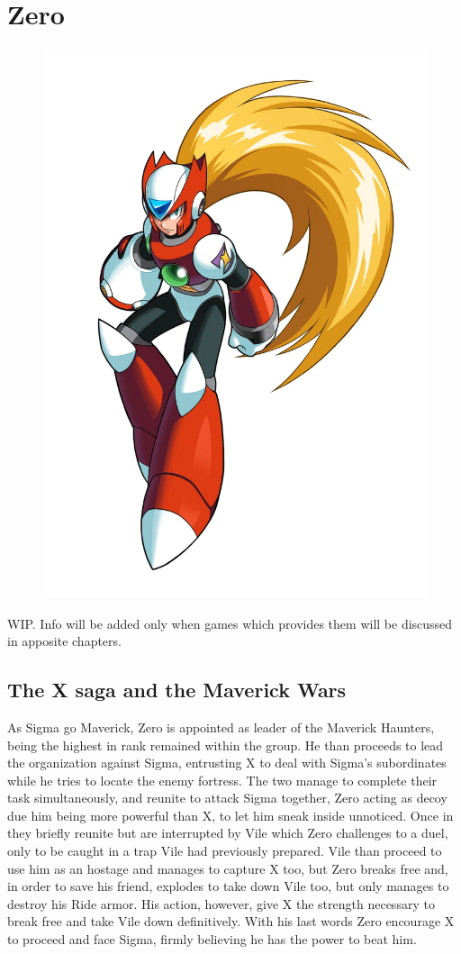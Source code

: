 \chapter{Zero}\label{char:Zero}
\begin{figure}[h]
	\centering
	\includegraphics[width=0.4\linewidth]{figures/Characters/Char_Z.png}
\end{figure}
WIP. Info will be added only when games which provides them will be discussed in apposite chapters.

\section{The X saga and the Maverick Wars}
As Sigma go Maverick, Zero is appointed as leader of the Maverick Haunters, being the highest in rank remained within the group. He than proceeds to lead the organization against Sigma, entrusting X to deal with Sigma's subordinates while he tries to locate the enemy fortress. The two manage to complete their task simultaneously, and reunite to attack Sigma together, Zero acting as decoy due him being more powerful than X, to let him sneak inside unnoticed. Once in they briefly reunite but are interrupted by Vile which Zero  challenges to a duel, only to be caught in a trap Vile had previously prepared. Vile than proceed to use him as an hostage and manages to capture X too, but Zero breaks free and, in order to save his friend, explodes to take down Vile too, but only manages to destroy his Ride armor. His action, however, give X the strength necessary to break free and take Vile down definitively. With his last words Zero encourage X to proceed and face Sigma, firmly believing he has the power to beat him.
